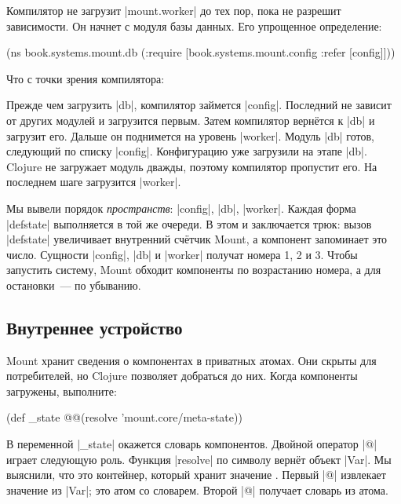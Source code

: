 Компилятор не загрузит \spverb|mount.worker| до тех пор, пока не разрешит
зависимости. Он начнет с модуля базы данных. Его упрощенное определение:

\begin{english}
  \begin{clojure}
(ns book.systems.mount.db
  (:require
   [book.systems.mount.config :refer [config]]))
  \end{clojure}
\end{english}

\noindent
Что с точки зрения компилятора:


Прежде чем загрузить \spverb|db|, компилятор займется \spverb|config|. Последний
не зависит от других модулей и загрузится первым. Затем компилятор верн\"{е}тся к
\spverb|db| и загрузит его. Дальше он поднимется на уровень
\spverb|worker|. Модуль \spverb|db| готов, следующий по списку
\spverb|config|. Конфигурацию уже загрузили на этапе \spverb|db|. Clojure не
загружает модуль дважды, поэтому компилятор пропустит его. На последнем шаге
загрузится \spverb|worker|.

Мы вывели порядок \emph{пространств}: \spverb|config|, \spverb|db|,
\spverb|worker|. Каждая форма \spverb|defstate| выполняется в той же очереди. В
этом и заключается трюк: вызов \spverb|defstate| увеличивает внутренний сч\"{е}тчик
Mount, а компонент запоминает это число. Сущности \spverb|config|, \spverb|db| и
\spverb|worker| получат номера 1, 2 и 3. Чтобы запустить систему, Mount
обходит компоненты по возрастанию номера, а для остановки~--- по убыванию.

\subsection{Внутреннее устройство}

Mount хранит сведения о компонентах в приватных атомах. Они скрыты для
потребителей, но Clojure позволяет добраться до них. Когда компоненты загружены,
выполните:

\begin{english}
  \begin{clojure}
(def _state @@(resolve 'mount.core/meta-state))
  \end{clojure}
\end{english}

В переменной \spverb|_state| окажется словарь компонентов. Двойной оператор
\spverb|@| играет следующую роль. Функция \spverb|resolve| по символу верн\"{е}т
объект \spverb|Var|. Мы выяснили, что это контейнер, который хранит
значение . Первый \spverb|@| извлекает значение из
\spverb|Var|; это атом со словарем. Второй \spverb|@| получает словарь из атома.

